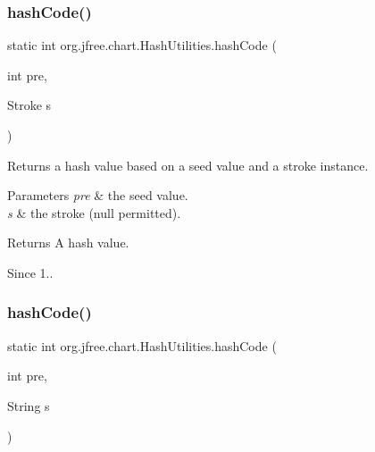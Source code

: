 \subsubsection{\texorpdfstring{hash\+Code()}{hashCode()}\hspace{0.1cm}{\footnotesize\ttfamily [5/11]}}
{\footnotesize\ttfamily static int org.\+jfree.\+chart.\+Hash\+Utilities.\+hash\+Code (\begin{DoxyParamCaption}\item[{int}]{pre,  }\item[{Stroke}]{s }\end{DoxyParamCaption})\hspace{0.3cm}{\ttfamily [static]}}

Returns a hash value based on a seed value and a stroke instance.


\begin{DoxyParams}{Parameters}
{\em pre} & the seed value. \\
\hline
{\em s} & the stroke ({\ttfamily null} permitted).\\
\hline
\end{DoxyParams}
\begin{DoxyReturn}{Returns}
A hash value.
\end{DoxyReturn}
\begin{DoxySince}{Since}
1.. 
\end{DoxySince}
\mbox{\label{classorg_1_1jfree_1_1chart_1_1_hash_utilities_a6d0e49602b82e6b6b47a85d117ebd178}} 
\subsubsection{\texorpdfstring{hash\+Code()}{hashCode()}\hspace{0.1cm}{\footnotesize\ttfamily [6/11]}}
{\footnotesize\ttfamily static int org.\+jfree.\+chart.\+Hash\+Utilities.\+hash\+Code (\begin{DoxyParamCaption}\item[{int}]{pre,  }\item[{String}]{s }\end{DoxyParamCaption})\hspace{0.3cm}{\ttfamily [static]}}

